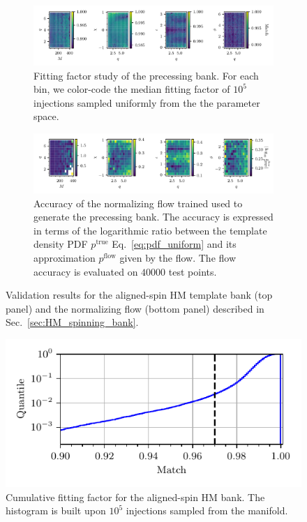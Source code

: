 \documentclass[twocolumn,showpacs,preprintnumbers,nofootinbib,prd,
superscriptaddress,10pt]{revtex4-2}
\begin{document}
\begin{figure}[t]
	\centering
	\begin{subfigure}[t]{\textwidth}
		\includegraphics[scale = 1.]{HM_injections}
		\caption{Fitting factor study of the precessing bank. For each bin, we color-code the median fitting factor of $10^5$ injections sampled uniformly from the the parameter space.}
		\label{fig:HM_fitting_factor}
	\end{subfigure}
	\begin{subfigure}[t]{\textwidth}
		\includegraphics[scale = 1.]{HM_flow_accuracy}
		\caption{Accuracy of the normalizing flow trained used to generate the precessing bank. The accuracy is expressed in terms of the logarithmic ratio between the template density PDF $p^\text{true}$ Eq.~\eqref{eq:pdf_uniform} and its approximation $p^\text{flow}$ given by the flow. The flow accuracy is evaluated on $40000$ test points.}
		\label{fig:HM_flow}
	\end{subfigure}
	\caption{Validation results for the aligned-spin HM template bank (top panel) and the normalizing flow (bottom panel) described in Sec.~\ref{sec:HM_spinning_bank}.}
	\label{fig:HM_injections}
\end{figure}

\begin{figure}[t]
	\centering
	\includegraphics[scale = 1.]{HM_hist}
	\caption{Cumulative fitting factor for the aligned-spin HM bank. The histogram is built upon $10^5$ injections sampled from the manifold.}
	\label{fig:HM_hist}
\end{figure}
\end{document}
